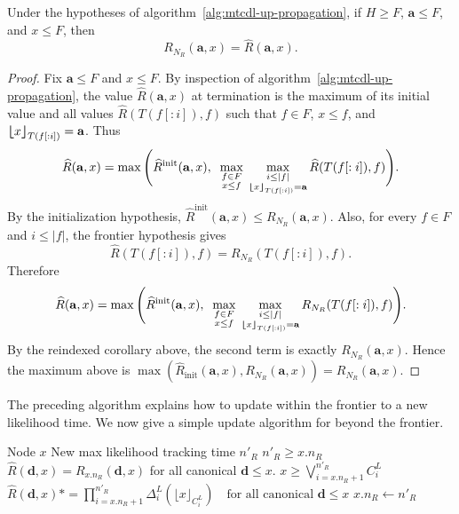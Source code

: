 \begin{theorem}
\label{theorem:mtcdl-up-propagation-correctness}
Under the hypotheses of algorithm~\ref{alg:mtcdl-up-propagation},
if $H \geq F$, $\mathbf{a} \leq F$, and $x \leq F$, then
\[
R_{N_R}(\mathbf{a}, x) = \widehat{R}(\mathbf{a}, x).
\]
\end{theorem}
\begin{proof}
    Fix $\mathbf{a} \leq F$ and $x \leq F$.
    By inspection of algorithm~\ref{alg:mtcdl-up-propagation},
    the value $\widehat{R}(\mathbf{a}, x)$ at termination is the maximum of its initial value
    and all values $\widehat{R}(T(f[:i]), f)$ such that $f \in F$, $x \leq f$, and
    ${\bm{\lfloor}} x {\bm{\rfloor}}_{T(f[:i])} = \mathbf{a}$.
    Thus
    $$
    \widehat{R}(\mathbf{a}, x)
    =
    \max \Bigg(
        \widehat{R}^{\mathrm{init}}(\mathbf{a}, x),
        \;\;
        \max_{\substack{
            f \in F \\
            x \leq f
        }}
        \;
        \max_{\substack{
            i \leq |f| \\
            {\bm{\lfloor}} x {\bm{\rfloor}}_{T(f[:i])} = \mathbf{a}
        }}
        \widehat{R}(T(f[:i]), f)
    \Bigg).
    $$
    By the initialization hypothesis, $\widehat{R}^{\mathrm{init}}(\mathbf{a}, x) \leq R_{N_R}(\mathbf{a}, x)$.
    Also, for every $f \in F$ and $i \leq |f|$, the frontier hypothesis gives
    $$
    \widehat{R}(T(f[:i]), f) = R_{N_R}(T(f[:i]), f).
    $$
    Therefore
    $$
    \widehat{R}(\mathbf{a}, x)
    =
    \max \Bigg(
        \widehat{R}^{\mathrm{init}}(\mathbf{a}, x),
        \;\;
        \max_{\substack{
            f \in F \\
            x \leq f
        }}
        \;
        \max_{\substack{
            i \leq |f| \\
            {\bm{\lfloor}} x {\bm{\rfloor}}_{T(f[:i])} = \mathbf{a}
        }}
        R_{N_R}(T(f[:i]), f)
    \Bigg).
    $$
    By the reindexed corollary above,
    the second term is exactly $R_{N_R}(\mathbf{a}, x)$. Hence the maximum above is
    $\max(\widehat{R}_{\mathrm{init}}(\mathbf{a}, x), R_{N_R}(\mathbf{a}, x)) = R_{N_R}(\mathbf{a}, x)$.
\end{proof}


The preceding algorithm explains how to update within the frontier
to a new likelihood time. We now give a simple update algorithm
for beyond the frontier.

\begin{algorithm}[H]
\caption{MTCDL Update}
\label{alg:mtcdl-update}
\begin{algorithmic}[1]
\Require Node $x$
\Require New max likelihood tracking time $n'_R$
\Require $n'_R \geq x.n_R$
\Require $\widehat{R}(\mathbf{d}, x) = R_{x.n_R}(\mathbf{d}, x)$ for all canonical $\mathbf{d} \leq x$.
\Require $x \geq \bigvee_{i=x.n_R+1}^{n'_R} C^L_i$
\State $\widehat{R}(\mathbf{d}, x) \mathrel{*=} \prod_{i=x.n_R+1}^{n'_R} \Delta^L_i(\lfloor x \rfloor_{C^L_i}) \quad \text{for all canonical } \mathbf{d} \leq x$
\State $x.n_R \gets n'_R$
\end{algorithmic}
\end{algorithm}

